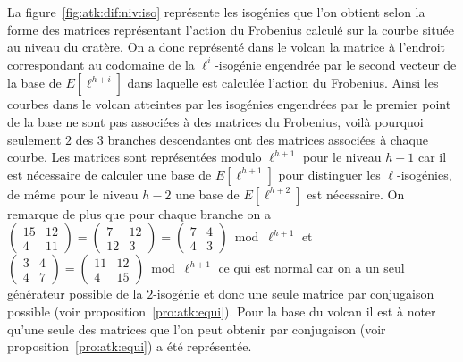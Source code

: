\documentclass[10pt,a4paper]{book}
\theoremstyle{plain}
\theoremstyle{definition}
\theoremstyle{definition}
\theoremstyle{definition}
\theoremstyle{definition}
\theoremstyle{remark}
\theoremstyle{remark}
\theoremstyle{definition}
\begin{document}
La figure~\ref{fig:atk:dif:niv:iso} représente les isogénies que l'on obtient 
selon la forme des matrices représentant l'action du Frobenius calculé sur la 
courbe située au niveau du cratère. On a donc représenté dans le volcan la 
matrice à l'endroit correspondant au codomaine de la $\ell^{i}$-isogénie 
engendrée par le second vecteur de la base de $E[\ell^{h+i}]$ dans laquelle est
calculée l'action du Frobenius. Ainsi les courbes dans le volcan atteintes
par les isogénies engendrées par le premier point de la base ne sont pas 
associées à des matrices du Frobenius, voilà pourquoi seulement $2$ des $3$ 
branches descendantes ont des matrices associées à chaque courbe. Les matrices 
sont représentées modulo $\ell^{h+1}$ pour le niveau $h-1$ car il est 
nécessaire de calculer une base de $E[\ell^{h+1}]$ pour distinguer les 
$\ell$-isogénies, de même pour le niveau $h-2$ une base de $E[\ell^{h+2}]$ est 
nécessaire. On remarque de plus que pour chaque branche on a $\left( 
\begin{smallmatrix}15 & 12 \\4  & 11 \end{smallmatrix} \right) = \left( 
\begin{smallmatrix}7 & 12 \\12  & 3 \end{smallmatrix} \right) = \left( 
\begin{smallmatrix}7 & 4 \\4  & 3 \end{smallmatrix} \right) \bmod \ell^{h+1}$ 
et $\left( \begin{smallmatrix}3 & 4 \\4  & 7 \end{smallmatrix} \right)  = 
\left( \begin{smallmatrix}11 & 12 \\4 & 15 \end{smallmatrix} \right) \bmod 
\ell^{h+1}$ ce qui est normal car on a un seul générateur possible de la 
$2$-isogénie et donc une seule matrice par conjugaison possible (voir 
proposition~\ref{pro:atk:equi}). Pour la base du volcan il est à 
noter qu'une seule des matrices que l'on peut obtenir par conjugaison (voir 
proposition~\ref{pro:atk:equi}) a été représentée.
\end{document}
